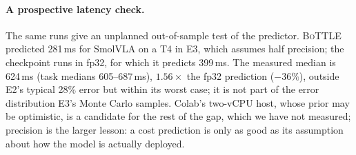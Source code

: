 \documentclass[10pt]{article}
\newcommand{\bottle}{\textsc{BoTTLE}}
\begin{document}
\paragraph{A prospective latency check.} The same runs give an unplanned out-of-sample test of
the predictor. \bottle{} predicted 281\,ms for SmolVLA on a T4 in E3, which assumes half
precision; the checkpoint runs in fp32, for which it predicts 399\,ms. The measured median is
624\,ms (task medians 605--687\,ms), $1.56\times$ the fp32 prediction ($-36\%$), outside E2's
typical 28\% error but within its worst case; it is not part of the error distribution E3's Monte
Carlo samples. Colab's two-vCPU host, whose prior may be optimistic, is a candidate for the rest of
the gap, which we have not measured; precision is the larger lesson: a cost prediction is only as good as
its assumption about how the model is actually deployed.
\end{document}

